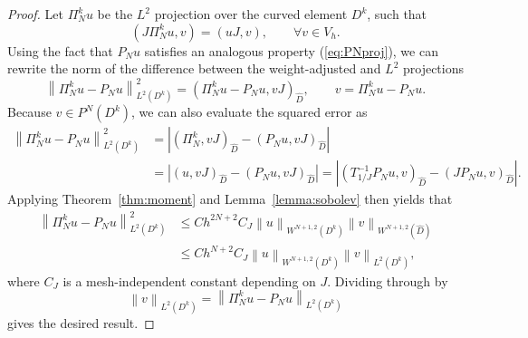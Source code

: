 \documentclass[preprint,10pt]{article}
\theoremstyle{definition}
\theoremstyle{lemma}
\theoremstyle{theorem}
\theoremstyle{assumption}
\renewcommand{\hat}{\widehat}
\newcommand{\nor}[1]{\left\| #1 \right\|}
\newcommand{\LRp}[1]{\left( #1 \right)}
\newcommand{\LRb}[1]{\left| #1 \right|}
\begin{document}
\begin{proof}
Let $\Pi_N^k u$ be the $L^2$ projection over the curved element $D^k$, such that
\[
\LRp{J\Pi_N^k u,v} = \LRp{u J,v}, \qquad \forall v\in V_h.
\]
Using the fact that $P_N u$ satisfies an analogous property (\ref{eq:PNproj}),  we can rewrite the norm of the difference between the weight-adjusted and $L^2$ projections
\[
\nor{\Pi_N^k  u - P_N u}_{L^2\LRp{D^k}}^2 = \LRp{\Pi_N^k  u - P_N u,vJ}_{\hat{D}}, \qquad v = \Pi_N^k  u - P_N u.
\]
Because $v \in P^N\LRp{D^k}$, we can also evaluate the squared error as
\begin{align*}
\nor{\Pi_N^k  u - P_N u}_{L^2\LRp{D^k}}^2 &= \LRb{\LRp{\Pi_N^k ,vJ}_{\hat{D}} - \LRp{P_N u,vJ}_{\hat{D}}}\\
& = \LRb{\LRp{u,vJ}_{\hat{D}} - \LRp{P_N u,vJ}_{\hat{D}}} = \LRb{\LRp{T_{1/J}^{-1}P_N u,v}_{\hat{D}} - \LRp{JP_N u,v}_{\hat{D}}}.
\end{align*}
Applying Theorem~\ref{thm:moment} and Lemma~\ref{lemma:sobolev} then yields that 
\begin{align*}
\nor{\Pi_N^k u - P_N u}_{L^2\LRp{D^k}}^2 &\leq Ch^{2N+2} C_J\nor{u}_{W^{N+1,2}\LRp{D^k}}
\nor{v}_{W^{N+1,2}\LRp{\hat{D}}} \\
&\leq Ch^{N+2} C_J\nor{u}_{W^{N+1,2}\LRp{D^k}}\nor{v}_{L^2\LRp{D^k}},
\end{align*}
where $C_J$ is a mesh-independent constant depending on $J$.  Dividing through by 
\[
\nor{v}_{L^2\LRp{D^k}} = \nor{\Pi^k_N u - P_N u}_{L^2\LRp{D^k}}
\]
 gives the desired result.  %
\end{proof}
\end{document}
